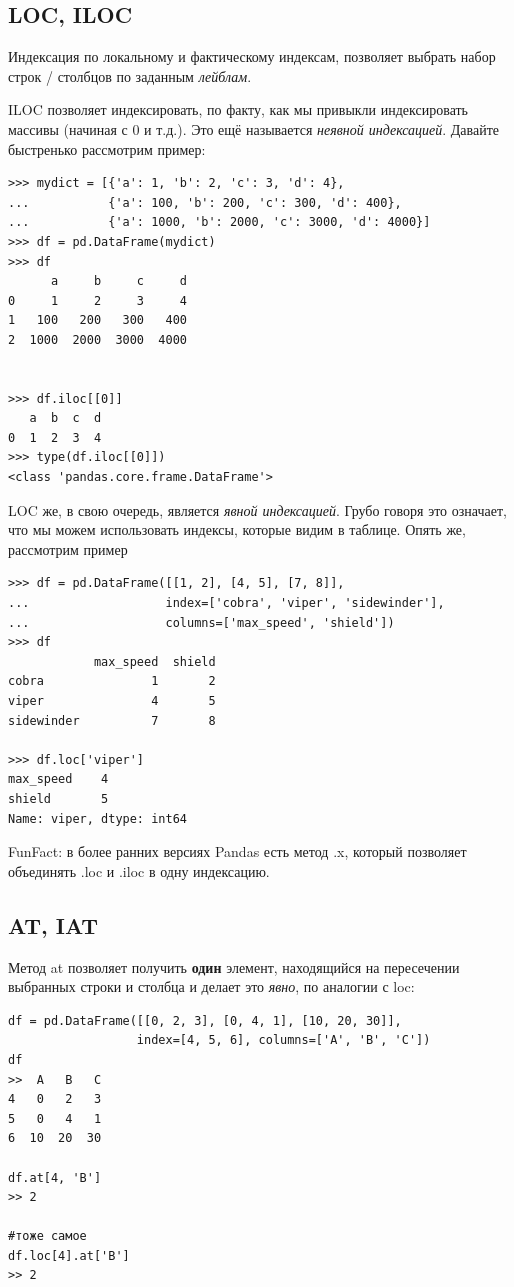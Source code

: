 \documentclass{article}
\begin{document}
\subsection*{LOC, ILOC}
Индексация по локальному и фактическому индексам, позволяет выбрать набор строк / столбцов по заданным \textit{лейблам}.

ILOC позволяет индексировать, по факту, как мы привыкли индексировать массивы (начиная с 0 и т.д.). Это ещё называется \textit{неявной индексацией}. Давайте быстренько рассмотрим пример:
\begin{verbatim}
>>> mydict = [{'a': 1, 'b': 2, 'c': 3, 'd': 4},
...           {'a': 100, 'b': 200, 'c': 300, 'd': 400},
...           {'a': 1000, 'b': 2000, 'c': 3000, 'd': 4000}]
>>> df = pd.DataFrame(mydict)
>>> df
      a     b     c     d
0     1     2     3     4
1   100   200   300   400
2  1000  2000  3000  4000


>>> df.iloc[[0]]
   a  b  c  d
0  1  2  3  4
>>> type(df.iloc[[0]])
<class 'pandas.core.frame.DataFrame'>
\end{verbatim}

LOC же, в свою очередь, является \textit{явной индексацией}. Грубо говоря это означает, что мы можем использовать индексы, которые видим в таблице. Опять же, рассмотрим пример
\begin{verbatim}
>>> df = pd.DataFrame([[1, 2], [4, 5], [7, 8]],
...                   index=['cobra', 'viper', 'sidewinder'],
...                   columns=['max_speed', 'shield'])
>>> df
            max_speed  shield
cobra               1       2
viper               4       5
sidewinder          7       8

>>> df.loc['viper']
max_speed    4
shield       5
Name: viper, dtype: int64
\end{verbatim}

FunFact: в более ранних версиях Pandas есть метод .x, который позволяет объединять .loc и .iloc в одну индексацию.

\subsection*{AT, IAT}
Метод at позволяет получить \textbf{один} элемент, находящийся на пересечении выбранных строки и столбца и делает это \textit{явно}, по аналогии с loc:
\begin{verbatim}
df = pd.DataFrame([[0, 2, 3], [0, 4, 1], [10, 20, 30]],
                  index=[4, 5, 6], columns=['A', 'B', 'C'])
df
>>  A   B   C
4   0   2   3
5   0   4   1
6  10  20  30

df.at[4, 'B']
>> 2

#тоже самое
df.loc[4].at['B']
>> 2
\end{verbatim}
\end{document}
